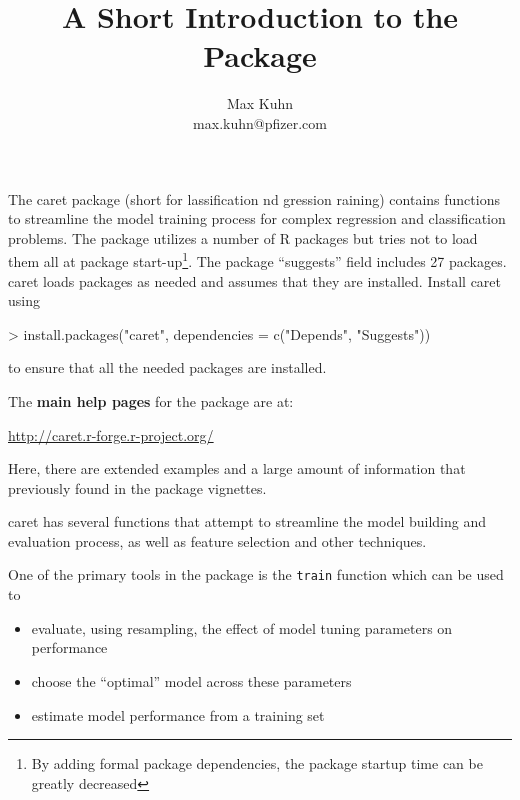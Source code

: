 \documentclass[12pt]{article}
\title{A Short Introduction to the \pkg{caret} Package}
\author{Max Kuhn \\ max.kuhn@pfizer.com}
\newcommand{\code}[1]{\mbox{\footnotesize\color{darkblue}\texttt{#1}}}
\newcommand{\pkg}[1]{{\fontseries{b}\selectfont #1}}
\renewcommand{\pkg}[1]{{\textsf{#1}}}
\renewenvironment{Schunk}{\vspace{\topsep}}{\vspace{\topsep}}
\begin{document}


\maketitle

\thispagestyle{empty}
  
\vspace{.2in}

\renewcommand{\baselinestretch}{1}
 
	
	


The \pkg{caret} package (short for
{\bf{\color{blue}{c}}}lassification {\bf{\color{blue}{a}}}nd
{\bf{\color{blue}{re}}}gression {\bf{\color{blue}{t}}}raining)
contains functions to streamline the model training process for
complex regression and classification problems. The package utilizes a
number of R packages but tries not to load them all at package
start-up\footnote{By adding formal package dependencies, the package
  startup time can be greatly decreased}. The package ``suggests''
field includes  27 packages. \pkg{caret} loads
packages as needed and assumes that they are installed. Install
\pkg{caret} using  
\begin{Schunk}
\begin{Sinput}
> install.packages("caret", dependencies = c("Depends", "Suggests"))
\end{Sinput}
\end{Schunk}
to ensure that all the needed packages are installed.

The {\bf main help pages} for the package are at:
\begin{center}
\url{http://caret.r-forge.r-project.org/}
\end{center}
Here, there are extended examples and a large amount of information
that previously found in the package vignettes. 


\pkg{caret} has several functions that attempt to streamline the model building and evaluation process, as well as feature selection and other techniques. 

One of the primary tools in the package is the \code{train} function which can be used to
\begin{itemize}
   \item evaluate, using resampling, the effect of model tuning parameters on performance
   \item choose the ``optimal'' model across these parameters 
   \item estimate model performance from a training set
\end{itemize}
\end{document}
